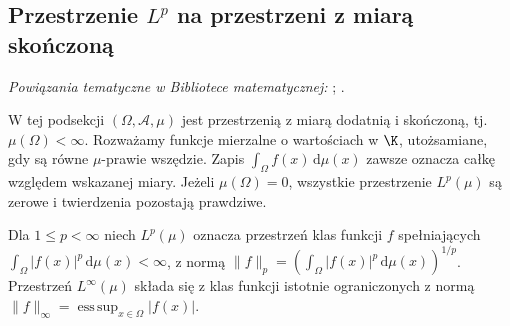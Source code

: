 \subsection{Przestrzenie \texorpdfstring{$L^p$}{Lp} na przestrzeni z miarą skończoną}

\noindent\emph{Powiązania tematyczne w Bibliotece matematycznej:} ; .


W tej podsekcji $(\Omega,\mathcal A,\mu)$ jest przestrzenią
z miarą dodatnią i skończoną, tj. $\mu(\Omega)<\infty$.
Rozważamy funkcje mierzalne o wartościach w $\K$, utożsamiane,
gdy są równe $\mu$-prawie wszędzie. Zapis
$\int_\Omega f(x)\,\mathrm d\mu(x)$ zawsze oznacza całkę
względem wskazanej miary. Jeżeli $\mu(\Omega)=0$, wszystkie
przestrzenie $L^p(\mu)$ są zerowe i twierdzenia pozostają prawdziwe.

\begin{definicja}[Przestrzenie $L^p(\mu)$]
\label{def:lp12}
Dla $1\le p<\infty$ niech $L^p(\mu)$ oznacza przestrzeń
klas funkcji $f$ spełniających
$\int_\Omega|f(x)|^p\,\mathrm d\mu(x)<\infty$, z normą
$\|f\|_p=(\int_\Omega|f(x)|^p\,\mathrm d\mu(x))^{1/p}$.
Przestrzeń $L^\infty(\mu)$ składa się z klas funkcji istotnie
ograniczonych z normą
$\|f\|_\infty=\operatorname*{ess\,sup}_{x\in\Omega}|f(x)|$.
\end{definicja}

